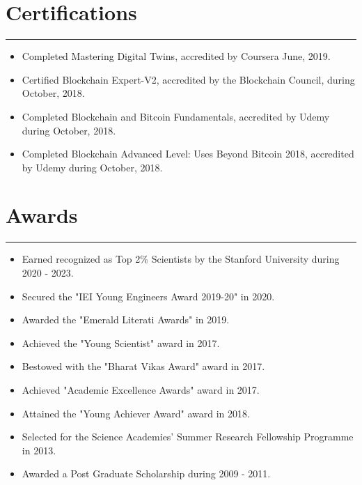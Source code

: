 \documentclass[10pt, a4paper]{article}
\begin{document}
	\section*{Certifications}
	\vspace*{-2.5mm}
	\hrule 
	\vspace*{2mm}
	\begin{itemize}[leftmargin=*]
		\item Completed Mastering Digital Twins, accredited by Coursera June, 2019.
		\vspace*{-2mm}
		\item	Certified Blockchain Expert-V2, accredited by the Blockchain Council, during October, 2018.
			\vspace*{-2mm}
			\item	Completed Blockchain and Bitcoin Fundamentals, accredited by Udemy during October, 2018.
			\vspace*{-2mm}
		\item	Completed Blockchain Advanced Level: Uses Beyond Bitcoin 2018, accredited by Udemy during October, 2018.
		
	\end{itemize}
	
	
	\section*{Awards}
	\vspace*{-2.5mm}
	\hrule 
	\vspace*{2mm}
	\begin{itemize}[leftmargin=*]
		\item Earned recognized as Top 2\% Scientists by the Stanford University during 2020 - 2023.
		\vspace*{-2mm}
		\item Secured the "IEI Young Engineers Award 2019-20" in 2020.
		\vspace*{-2mm}		
		\item Awarded the "Emerald Literati Awards" in 2019.
				\vspace*{-2mm}	
		\item Achieved the "Young Scientist" award in 2017.
				\vspace*{-2mm}	
		\item Bestowed with the "Bharat Vikas Award" award in 2017.
		\vspace*{-2mm}	
		\item Achieved "Academic Excellence Awards" award in 2017.
				\vspace*{-2mm}	
		\item Attained the "Young Achiever Award" award in 2018.
		
		\vspace*{-2mm}	
		\item Selected for the Science Academies’ Summer Research Fellowship Programme in 2013.	
		\vspace*{-2mm}	
		\item  Awarded a Post Graduate Scholarship during 2009 - 2011.	
		
	\end{itemize}
	
\end{document}

